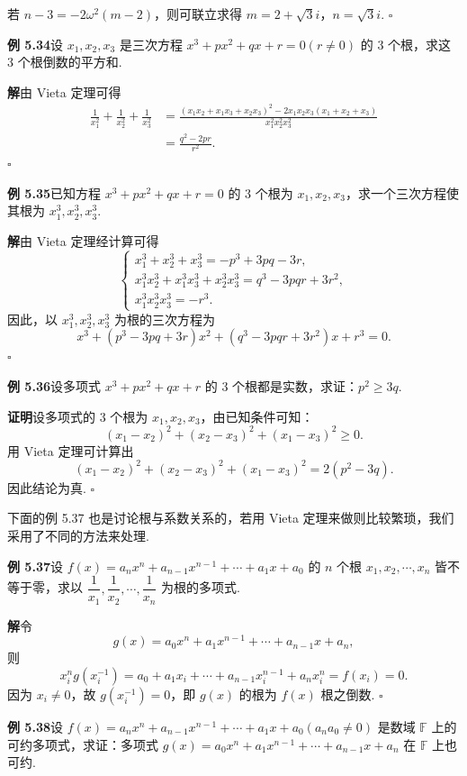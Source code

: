 \documentclass[UTF8,12pt,a4paper,fontset=fandol]{ctexart}
\begin{document}
若 $n-3=-2\omega^2(m-2)$，则可联立求得 $m=2+\sqrt3 i$，$n=\sqrt3 i$. \hfill $\square$

\noindent\textbf{例 5.34}\quad 设 $x_1,x_2,x_3$ 是三次方程 $x^3+px^2+qx+r=0(r\ne0)$ 的 3 个根，求这 3 个根倒数的平方和.

\noindent\textbf{解}\quad 由 Vieta 定理可得
\[
\begin{aligned}
\frac{1}{x_1^2}+\frac{1}{x_2^2}+\frac{1}{x_3^2}
&=\frac{(x_1x_2+x_1x_3+x_2x_3)^2-2x_1x_2x_3(x_1+x_2+x_3)}
{x_1^2x_2^2x_3^2}\\
&=\frac{q^2-2pr}{r^2}.
\end{aligned}
\]
\hfill $\square$

\noindent\textbf{例 5.35}\quad 已知方程 $x^3+px^2+qx+r=0$ 的 3 个根为 $x_1,x_2,x_3$，求一个三次方程使其根为 $x_1^3,x_2^3,x_3^3$.

\noindent\textbf{解}\quad 由 Vieta 定理经计算可得
\[
\left\{
\begin{array}{l}
x_1^3+x_2^3+x_3^3=-p^3+3pq-3r,\\
x_1^3x_2^3+x_1^3x_3^3+x_2^3x_3^3=q^3-3pqr+3r^2,\\
x_1^3x_2^3x_3^3=-r^3.
\end{array}
\right.
\]
因此，以 $x_1^3,x_2^3,x_3^3$ 为根的三次方程为
\[
x^3+(p^3-3pq+3r)x^2+(q^3-3pqr+3r^2)x+r^3=0.
\]
\hfill $\square$

\noindent\textbf{例 5.36}\quad 设多项式 $x^3+px^2+qx+r$ 的 3 个根都是实数，求证：$p^2\ge3q$.

\noindent\textbf{证明}\quad 设多项式的 3 个根为 $x_1,x_2,x_3$，由已知条件可知：
\[
(x_1-x_2)^2+(x_2-x_3)^2+(x_1-x_3)^2\ge0.
\]
用 Vieta 定理可计算出
\[
(x_1-x_2)^2+(x_2-x_3)^2+(x_1-x_3)^2=2(p^2-3q).
\]
因此结论为真. \hfill $\square$

下面的例 5.37 也是讨论根与系数关系的，若用 Vieta 定理来做则比较繁琐，我们采用了不同的方法来处理.

\noindent\textbf{例 5.37}\quad 设 $f(x)=a_nx^n+a_{n-1}x^{n-1}+\cdots+a_1x+a_0$ 的 $n$ 个根 $x_1,x_2,\cdots,x_n$ 皆不等于零，求以 $\dfrac1{x_1},\dfrac1{x_2},\cdots,\dfrac1{x_n}$ 为根的多项式.

\noindent\textbf{解}\quad 令
\[
g(x)=a_0x^n+a_1x^{n-1}+\cdots+a_{n-1}x+a_n,
\]
则
\[
x_i^ng(x_i^{-1})=a_0+a_1x_i+\cdots+a_{n-1}x_i^{n-1}+a_nx_i^n=f(x_i)=0.
\]
因为 $x_i\ne0$，故 $g(x_i^{-1})=0$，即 $g(x)$ 的根为 $f(x)$ 根之倒数. \hfill $\square$

\noindent\textbf{例 5.38}\quad 设 $f(x)=a_nx^n+a_{n-1}x^{n-1}+\cdots+a_1x+a_0(a_na_0\ne0)$ 是数域 $\mathbb{F}$ 上的可约多项式，求证：多项式 $g(x)=a_0x^n+a_1x^{n-1}+\cdots+a_{n-1}x+a_n$ 在 $\mathbb{F}$ 上也可约.
\end{document}
